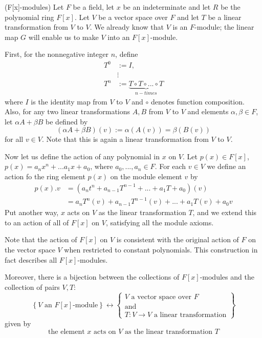 \documentclass[12pt, a4paper, twoside, openright, titlepage]{book}
\begin{document}
\begin{eg}{(F{[x]}-modules)}{}
    Let $F$ be a field, let $x$ be an indeterminate and let $R$ be the polynomial ring $F[x]$. Let $V$ be a vector space over $F$ and let $T$ be a linear transformation from $V$ to $V$. We already know that $V$ is an $F$-module; the linear map $G$ will enable us to make $V$ into an $F[x]$-module.

    First, for the nonnegative integer $n$, define \begin{align*}
        T^0 &:= I, \\
        &\vdots \\
        T^n &:= \underbrace{T\circ T\circ ...\circ T}_{n-times}
    \end{align*}
    where $I$ is the identity map from $V$ to $V$ and $\circ$ denotes function composition. Also, for any two linear transformations $A, B$ from $V$ to $V$ and elements $\alpha,\beta \in F$, let $\alpha A+\beta B$ be defined by \begin{equation*}
        (\alpha A + \beta B)(v) := \alpha(A(v)) = \beta(B(v))
    \end{equation*}
    for all $v \in V$. Note that this is again a linear transformation from $V$ to $V$.


    Now let us define the action of any polynomial in $x$ on $V$. Let $p(x) \in F[x]$, $p(x) = a_nx^n+...a_1x+a_0$, where $a_0,...,a_n \in F$. For each $v \in V$ we define an action fo the ring element $p(x)$ on the module element $v$ by \begin{align*}
        p(x).v &= (a_nt^n+a_{n-1}T^{n-1}+...+a_1T+a_0)(v) \\
        &= a_nT^n(v) + a_{n-1}T^{n-1}(v) + ... + a_1T(v) + a_0v
    \end{align*}
    Put another way, $x$ acts on $V$ as the linear transformation $T$, and we extend this to an action of all of $F[x]$ on $V$, satisfying all the module axioms.

    Note that the action of $F[x]$ on $V$ is consistent with the original action of $F$ on the vector space $V$ when restricted to constant polynomials. This construction in fact describes all $F[x]$-modules.

    Moreover, there is a bijection between the collections of $F[x]$-modules and the collection of pairs $V,T$: \begin{equation*}
        \left\{V\text{ an }F[x]\text{-module}\right\} \leftrightarrow \left\{\begin{array}{c} V\text{ a vector space over } F \\ \text{and} \\ T:V\rightarrow V\text{ a linear transformation}\end{array}\right\}
    \end{equation*}
    given by \begin{equation*}
        \text{the element $x$ acts on $V$ as the linear transformation $T$}
    \end{equation*}


\end{eg}
\end{document}
